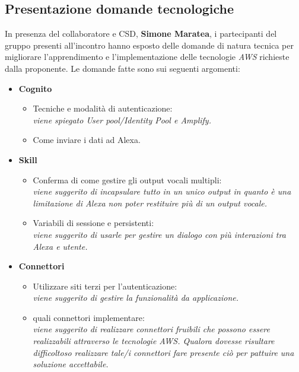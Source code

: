 	\subsection{Presentazione domande tecnologiche}
	\label{sec:presentazione_domande_tecnologiche}
	In presenza del collaboratore e CSD, \textbf{Simone Maratea}, i partecipanti del gruppo presenti all'incontro hanno esposto delle domande di natura tecnica per migliorare l'apprendimento e l'implementazione delle tecnologie \textit{AWS} richieste dalla proponente.  Le domande fatte sono sui seguenti argomenti:
	\begin{itemize}
		\item \textbf{Cognito}
			\begin{itemize}
				\item Tecniche e modalità di autenticazione:\\ \textit{viene spiegato \textit{User pool/Identity Pool} e \textit{Amplify}.}
				\item Come inviare i dati ad Alexa.
			\end{itemize}
		\item \textbf{Skill}
			\begin{itemize}
			\item Conferma di come gestire gli output vocali multipli:\\ \textit{viene suggerito di incapsulare tutto in un unico output in quanto è una limitazione di Alexa non poter restituire più di un output vocale.}
			\item Variabili di sessione e persistenti:\\ \textit{viene suggerito di usarle per gestire un dialogo con più interazioni tra Alexa e utente.}
			\end{itemize}
		\item \textbf{Connettori}
			\begin{itemize}
			\item Utilizzare siti terzi per l'autenticazione:\\ \textit{viene suggerito di gestire la funzionalità da applicazione.}
			\item quali connettori implementare:\\ \textit{viene suggerito di realizzare connettori fruibili che possono essere realizzabili attraverso le tecnologie AWS. Qualora dovesse risultare difficoltoso realizzare tale/i connettori fare presente ciò per pattuire una soluzione accettabile.}
			\end{itemize}
	\end{itemize}